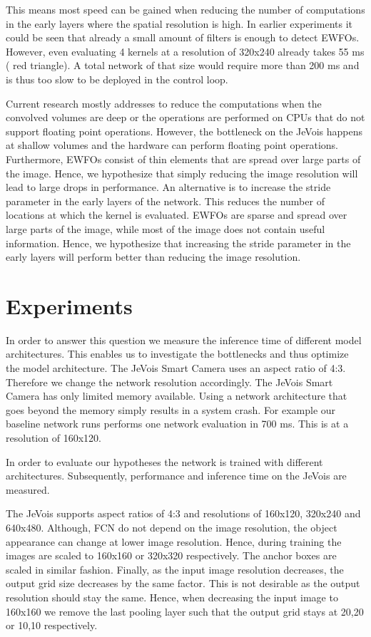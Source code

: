 This means most speed can be gained when reducing the number of computations in the early layers where the spatial resolution is high. In earlier experiments it could be seen that already a small amount of filters is enough to detect \acp{EWFO}. However, even evaluating 4 kernels at a resolution of 320x240 already takes 55 ms ( red triangle). A total network of that size would require more than 200 ms and is thus too slow to be deployed in the control loop.

Current research mostly addresses to reduce the computations when the convolved volumes are deep or the operations are performed on \acp{CPU} that do not support floating point operations. However, the bottleneck on the JeVois happens at shallow volumes and the hardware can perform floating point operations. Furthermore, \acp{EWFO} consist of thin elements that are spread over large parts of the image. Hence, we hypothesize that simply reducing the image resolution will lead to large drops in performance. An alternative is to increase the stride parameter in the early layers of the network. This reduces the number of locations at which the kernel is evaluated. \acp{EWFO} are sparse and spread over large parts of the image, while most of the image does not contain useful information. Hence, we hypothesize that increasing the stride parameter in the early layers will perform better than reducing the image resolution.

\section{Experiments}

In order to answer this question we measure the inference time of different model architectures. This enables us to investigate the bottlenecks and thus optimize the model architecture. The JeVois Smart Camera uses an aspect ratio of 4:3. Therefore we change the network resolution accordingly. The JeVois Smart Camera has only limited memory available. Using a network architecture that goes beyond the memory simply results in a system crash. For example our baseline network runs performs one network evaluation in 700 ms. This is at a resolution of 160x120.

In order to evaluate our hypotheses the network is trained with different architectures. Subsequently, performance and inference time on the JeVois are measured.

The JeVois supports aspect ratios of 4:3 and resolutions of 160x120, 320x240 and 640x480. Although, \ac{FCN} do not depend on the image resolution, the object appearance can change at lower image resolution. Hence, during training the images are scaled to 160x160 or 320x320 respectively. The anchor boxes are scaled in similar fashion. Finally, as the input image resolution decreases, the output grid size decreases by the same factor. This is not desirable as the output resolution should stay the same. Hence, when decreasing the input image to 160x160 we remove the last pooling layer such that the output grid stays at 20,20 or 10,10 respectively.

